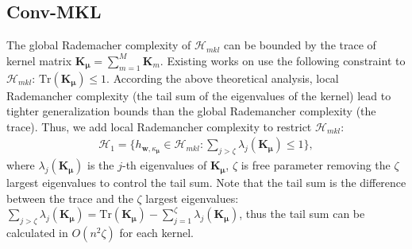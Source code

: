 \documentclass{article}
\begin{document}
\subsection{Conv-MKL}
The global Rademacher complexity of $\mathcal{H}_{mkl}$ can be bounded by the trace of kernel matrix $\mathbf{K}_{\bm \mu}=\sum_{m=1}^M\mathbf K_m$.
Existing works on \cite{LanckrietCBGJ02,BachLJ04,SonnenburgRSS06} use the following constraint to $\mathcal{H}_{mkl}$:
$\mathrm{Tr}(\mathbf{K}_{\bm \mu}) \leq 1.$
According the above theoretical analysis,
local Rademancher complexity (the tail sum of the eigenvalues of the kernel) lead to
tighter generalization bounds than the global Rademancher complexity (the trace).
Thus, we add local Rademancher complexity to restrict $\mathcal{H}_{mkl}$:
\begin{align}
    \mathcal{H}_{1}=\Big\{h_{\mathbf{w}, \kappa_{\bm \mu}} \in \mathcal{H}_{mkl}:\sum_{j > \zeta} \lambda_j(\mathbf{K}_{\bm \mu}) \leq 1\Big\},
\end{align}
where $\lambda_j(\mathbf K_{\bm \mu})$ is the $j$-th eigenvalues of $\mathbf K_{\bm \mu}$,
$\zeta$ is free parameter removing the $\zeta$ largest eigenvalues to control the tail sum.
Note that the tail sum is the difference between the trace and
the $\zeta$ largest eigenvalues: $\sum_{j>\zeta}\lambda_j(\mathbf{K}_{\bm \mu})=\mathrm{Tr}(\mathbf{K}_{\bm \mu})-\sum_{j=1}^\zeta\lambda_j(\mathbf{K}_{\bm \mu})$,
thus the tail sum can be calculated in $O(n^2\zeta)$ for each kernel.
\end{document}
